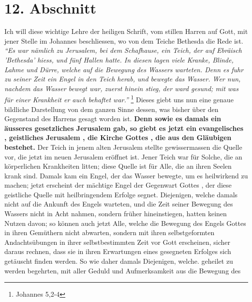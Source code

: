 \section{12. Abschnitt} \label{kap6_ab12}

Ich will diese wichtige Lehre der heiligen Schrift, vom stillen Harren auf Gott,
mit jener Stelle im Johannes beschliessen, wo von dem Teiche Bethesda
die Rede ist.
\textit{"`Es war nämlich zu Jerusalem, bei dem Schafhause, ein Teich, der
auf Ebräisch 'Bethesda' hiess, und fünf Hallen hatte. In diesen lagen viele
Kranke, Blinde, Lahme und Dürre, welche auf die Bewegung des Wassers warteten.
Denn es fuhr zu seiner Zeit ein Engel in den Teich herab, und bewegte das
Wasser. Wer nun, nachdem das Wasser bewegt war, zuerst hinein stieg, der ward
gesund; mit was für einer Krankheit er auch behaftet war."'}
\footnote{Johannes 5,2-4}
Dieses giebt uns nun eine genaue bildliche Darstellung von dem ganzen Sinne
dessen, was bisher über den Gegenstand des Harrens gesagt worden ist.
\textbf{Denn sowie
es damals ein äusseres gesetzliches Jerusalem 
gab, so giebt es jetzt ein
evangelisches  , geistliches Jerusalem
, die Kirche Gottes , die aus
den Gläubigen 
bestehet.} Der Teich in jenem alten Jerusalem 
stellte gewissermassen die Quelle
vor, die jetzt im neuen Jerusalem  eröffnet ist.
Jener Teich war für Solche, die
an körperlichen Krankheiten litten; diese Quelle ist für Alle, die an ihren
Seelen krank sind. Damals kam ein Engel, der das Wasser bewegte, um es
heilwirkend zu machen; jetzt erscheint der mächtige Engel  der
Gegenwart Gottes ,
der diese geistliche Quelle  mit heilbringendem Erfolge
segnet. Diejenigen,
welche damals nicht auf die Ankunft des Engels warteten, und die Zeit seiner
Bewegung des Wassers nicht in Acht nahmen, sondern früher hineinstiegen, hatten
keinen Nutzen davon; so können auch jetzt Alle, welche die Bewegung des Engels
Gottes in ihren Gemüthern nicht abwarten, sondern mit ihren selbstgeformten
Andachtsübungen in ihrer selbstbestimmten Zeit vor Gott erscheinen, sicher
daraus rechnen, dass sie in ihren Erwartungen eines gesegneten Erfolges sich
getäuscht finden werden. So wie daher damals Diejenigen, welche. geheilet zu
werden begehrten, mit aller Geduld und Aufmerksamkeit aus die Bewegung des

